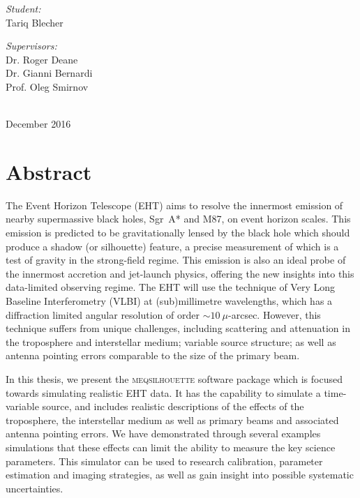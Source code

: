 \begin{titlepage}
\begin{minipage}{0.45\textwidth}
\begin{flushleft}\large 
\emph{Student:} \\
Tariq  {\sc Blecher}\\
\end{flushleft}
\end{minipage}
\begin{minipage}{0.45\textwidth}

\begin{flushright} \large
\emph{Supervisors:} \\
Dr. Roger {\sc Deane} \\
Dr. Gianni {\sc Bernardi} \\
Prof. Oleg {\sc Smirnov} \\
\end{flushright}
\end{minipage}\\[2cm]


{\large December 2016}

\end{titlepage}

\chapter*{Abstract} 
The Event Horizon Telescope (EHT) aims to resolve the innermost emission of nearby supermassive black holes, Sgr~A* and M87, on event horizon scales. This emission is predicted to be gravitationally lensed by the black hole which should produce a shadow (or silhouette) feature, a precise measurement of which is a test of gravity in the strong-field regime. This emission is also an ideal probe of the innermost accretion and jet-launch physics, offering the new insights into this data-limited observing regime. The EHT will use the technique of Very Long Baseline Interferometry (VLBI) at (sub)millimetre wavelengths, which has a diffraction limited angular resolution of order $\sim10~\mu$-arcsec. However, this technique suffers from unique challenges, including scattering and attenuation in the troposphere and interstellar medium; variable source structure; as well as antenna pointing errors comparable to the size of the primary beam. 


In this thesis, we present the \textsc{meqsilhouette} software package which is focused towards simulating realistic EHT data. It has the capability to simulate a time-variable source, and includes realistic descriptions of the effects of the troposphere, the interstellar medium as well as primary beams and associated antenna pointing errors. We have demonstrated through several examples simulations that these effects can limit the ability to measure the key science parameters. This simulator can be used to research calibration, parameter estimation and imaging strategies, as well as gain insight into possible systematic uncertainties. 

